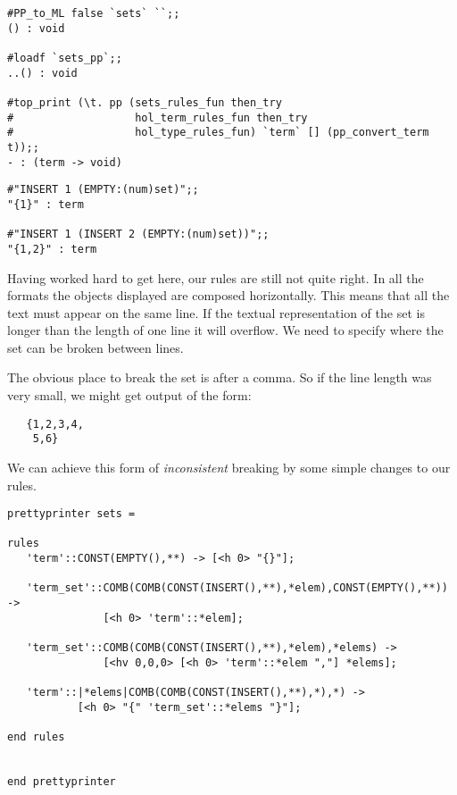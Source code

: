 \begin{session}\begin{verbatim}
#PP_to_ML false `sets` ``;;
() : void

#loadf `sets_pp`;;
..() : void

#top_print (\t. pp (sets_rules_fun then_try
#                   hol_term_rules_fun then_try
#                   hol_type_rules_fun) `term` [] (pp_convert_term t));;
- : (term -> void)
\end{verbatim}\end{session}

\begin{session}\begin{verbatim}
#"INSERT 1 (EMPTY:(num)set)";;
"{1}" : term

#"INSERT 1 (INSERT 2 (EMPTY:(num)set))";;
"{1,2}" : term
\end{verbatim}\end{session}

\noindent
Having worked hard to get here, our rules are still not quite right. In all the
formats the objects displayed are composed horizontally. This means that all
the text must appear on the same line. If the textual representation of the
set is longer than the length of one line it will overflow. We need to specify
where the set can be broken between lines.

The obvious place to break the set is after a comma. So if the line length was
very small, we might get output of the form:

\begin{small}\begin{verbatim}
   {1,2,3,4,
    5,6}
\end{verbatim}\end{small}

\noindent
We can achieve this form of {\it inconsistent\/} breaking by some simple
changes to our rules.

\begin{window}\begin{verbatim}
prettyprinter sets =

rules
   'term'::CONST(EMPTY(),**) -> [<h 0> "{}"];

   'term_set'::COMB(COMB(CONST(INSERT(),**),*elem),CONST(EMPTY(),**)) ->
               [<h 0> 'term'::*elem];

   'term_set'::COMB(COMB(CONST(INSERT(),**),*elem),*elems) ->
               [<hv 0,0,0> [<h 0> 'term'::*elem ","] *elems];

   'term'::|*elems|COMB(COMB(CONST(INSERT(),**),*),*) ->
           [<h 0> "{" 'term_set'::*elems "}"];

end rules


end prettyprinter
\end{verbatim}\end{window}

